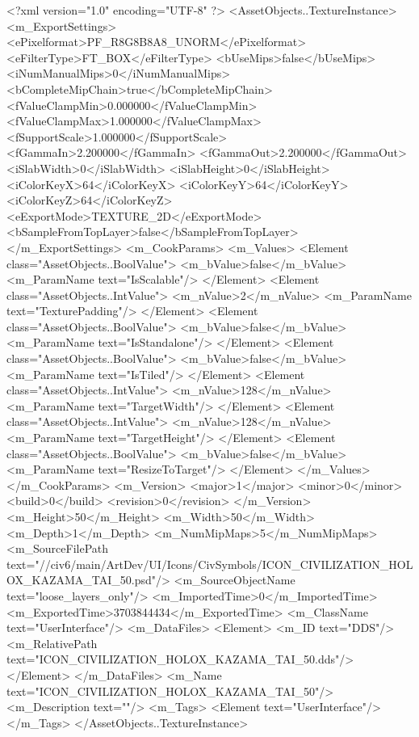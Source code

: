<?xml version="1.0" encoding="UTF-8" ?>
<AssetObjects..TextureInstance>
	<m_ExportSettings>
		<ePixelformat>PF_R8G8B8A8_UNORM</ePixelformat>
		<eFilterType>FT_BOX</eFilterType>
		<bUseMips>false</bUseMips>
		<iNumManualMips>0</iNumManualMips>
		<bCompleteMipChain>true</bCompleteMipChain>
		<fValueClampMin>0.000000</fValueClampMin>
		<fValueClampMax>1.000000</fValueClampMax>
		<fSupportScale>1.000000</fSupportScale>
		<fGammaIn>2.200000</fGammaIn>
		<fGammaOut>2.200000</fGammaOut>
		<iSlabWidth>0</iSlabWidth>
		<iSlabHeight>0</iSlabHeight>
		<iColorKeyX>64</iColorKeyX>
		<iColorKeyY>64</iColorKeyY>
		<iColorKeyZ>64</iColorKeyZ>
		<eExportMode>TEXTURE_2D</eExportMode>
		<bSampleFromTopLayer>false</bSampleFromTopLayer>
	</m_ExportSettings>
	<m_CookParams>
		<m_Values>
			<Element class="AssetObjects..BoolValue">
				<m_bValue>false</m_bValue>
				<m_ParamName text="IsScalable"/>
			</Element>
			<Element class="AssetObjects..IntValue">
				<m_nValue>2</m_nValue>
				<m_ParamName text="TexturePadding"/>
			</Element>
			<Element class="AssetObjects..BoolValue">
				<m_bValue>false</m_bValue>
				<m_ParamName text="IsStandalone"/>
			</Element>
			<Element class="AssetObjects..BoolValue">
				<m_bValue>false</m_bValue>
				<m_ParamName text="IsTiled"/>
			</Element>
			<Element class="AssetObjects..IntValue">
				<m_nValue>128</m_nValue>
				<m_ParamName text="TargetWidth"/>
			</Element>
			<Element class="AssetObjects..IntValue">
				<m_nValue>128</m_nValue>
				<m_ParamName text="TargetHeight"/>
			</Element>
			<Element class="AssetObjects..BoolValue">
				<m_bValue>false</m_bValue>
				<m_ParamName text="ResizeToTarget"/>
			</Element>
		</m_Values>
	</m_CookParams>
	<m_Version>
		<major>1</major>
		<minor>0</minor>
		<build>0</build>
		<revision>0</revision>
	</m_Version>
	<m_Height>50</m_Height>
	<m_Width>50</m_Width>
	<m_Depth>1</m_Depth>
	<m_NumMipMaps>5</m_NumMipMaps>
	<m_SourceFilePath text="//civ6/main/ArtDev/UI/Icons/CivSymbols/ICON_CIVILIZATION_HOLOX_KAZAMA_TAI_50.psd"/>
	<m_SourceObjectName text="loose_layers_only"/>
	<m_ImportedTime>0</m_ImportedTime>
	<m_ExportedTime>3703844434</m_ExportedTime>
	<m_ClassName text="UserInterface"/>
	<m_DataFiles>
		<Element>
			<m_ID text="DDS"/>
			<m_RelativePath text="ICON_CIVILIZATION_HOLOX_KAZAMA_TAI_50.dds"/>
		</Element>
	</m_DataFiles>
	<m_Name text="ICON_CIVILIZATION_HOLOX_KAZAMA_TAI_50"/>
	<m_Description text=""/>
	<m_Tags>
		<Element text="UserInterface"/>
	</m_Tags>
</AssetObjects..TextureInstance>

